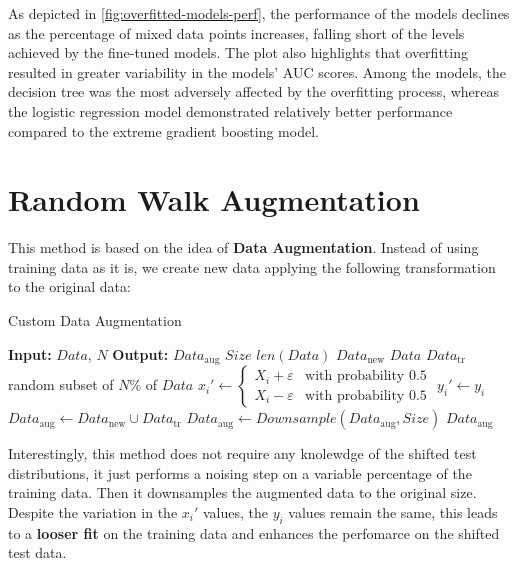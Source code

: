 As depicted in \cref{fig:overfitted-models-perf}, the performance of the models declines as the percentage of mixed data points increases, falling short of the levels achieved by the fine-tuned models. The plot also highlights that overfitting resulted in greater variability in the models' AUC scores. Among the models, the decision tree was the most adversely affected by the overfitting process, whereas the logistic regression model demonstrated relatively better performance compared to the extreme gradient boosting model.

\section{Random Walk Augmentation}

This method is based on the idea of \textbf{Data Augmentation}. Instead of using training data as it is, we create new data applying the following transformation to the original data:

\begin{algorithm}[H]
    \caption{Custom Data Augmentation}
    \begin{algorithmic}[1]
        \Statex \textbf{Input:} $Data$, $N$
        \Statex \textbf{Output:} $Data_\text{aug}$
        \Statex
        \State $Size$ \leftarrow $len(Data)$ 
        \State $Data_\text{new}$ \leftarrow $Data$
        \State $Data_\text{tr}$ \leftarrow random subset of $N\%$ of $Data$
            \State $x_i' \leftarrow 
            \begin{cases}
                X_i + \varepsilon & \text{with probability } 0.5 \\
                X_i - \varepsilon & \text{with probability } 0.5
            \end{cases}$
            \State $y_i' \leftarrow y_i$
        \EndFor
        \State $Data_\text{aug} \leftarrow Data_\text{new} \cup Data_\text{tr}$
        \State $Data_\text{aug} \leftarrow Downsample(Data_\text{aug}, Size)$
        \State\Return $Data_\text{aug}$
    \end{algorithmic}
\end{algorithm}

Interestingly, this method does not require any knolewdge of the shifted test distributions, it just performs a noising step on a variable percentage of the training data. Then it downsamples the augmented data to the original size.
Despite the variation in the $x_i'$ values, the $y_i$ values remain the same, this leads to a \textbf{looser fit} on the training data and enhances the perfomarce on the shifted test data.

